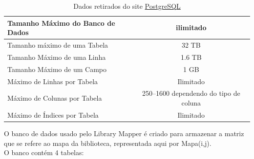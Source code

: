 \documentclass[a4paper,10pt]{article}
\begin{document}
	\begin{table}[H]
 	\centering
	\begin{tabular}{|l|c|} \hline
		Tamanho Máximo do Banco de Dados &  ilimitado\\ \hline
		Tamanho máximo de uma Tabela  &	32 TB\\ \hline
		Tamanho Máximo de uma Linha &	1.6 TB\\ \hline
		Tamanho Máximo de um Campo  & 	1 GB\\ \hline
		Máximo de Linhas por Tabela &	Ilimitado\\ \hline
		Máximo de Colunas por Tabela & 	250–1600 dependendo do tipo de coluna\\ \hline
Máximo de Índices por Tabela & 	Ilimitado\\ \hline
	\end{tabular}
	\caption{Dados retirados do site \href{http://www.postgresql.org.br/sobre}{PostgreSQL}}
	\label{t_fixa}
\end{table}	
	O banco de dados usado pelo Library Mapper é criado para armazenar a matriz que se refere ao mapa da biblioteca, 
	representada aqui por Mapa(i,j).\\O banco contém 4 tabelas:
\end{document}
